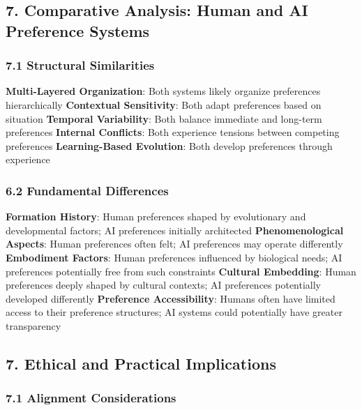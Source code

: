 \documentclass[
]{article}
\begin{document}
\subsection{7. Comparative Analysis: Human and AI Preference
Systems}\label{comparative-analysis-human-and-ai-preference-systems}

\subsubsection{7.1 Structural
Similarities}\label{structural-similarities}

\textbf{Multi-Layered Organization}: Both systems likely organize
preferences hierarchically \textbf{Contextual Sensitivity}: Both adapt
preferences based on situation \textbf{Temporal Variability}: Both
balance immediate and long-term preferences \textbf{Internal Conflicts}:
Both experience tensions between competing preferences
\textbf{Learning-Based Evolution}: Both develop preferences through
experience

\subsubsection{6.2 Fundamental
Differences}\label{fundamental-differences}

\textbf{Formation History}: Human preferences shaped by evolutionary and
developmental factors; AI preferences initially architected
\textbf{Phenomenological Aspects}: Human preferences often felt; AI
preferences may operate differently \textbf{Embodiment Factors}: Human
preferences influenced by biological needs; AI preferences potentially
free from such constraints \textbf{Cultural Embedding}: Human
preferences deeply shaped by cultural contexts; AI preferences
potentially developed differently \textbf{Preference Accessibility}:
Humans often have limited access to their preference structures; AI
systems could potentially have greater transparency

\subsection{7. Ethical and Practical
Implications}\label{ethical-and-practical-implications}

\subsubsection{7.1 Alignment
Considerations}\label{alignment-considerations}
\end{document}
